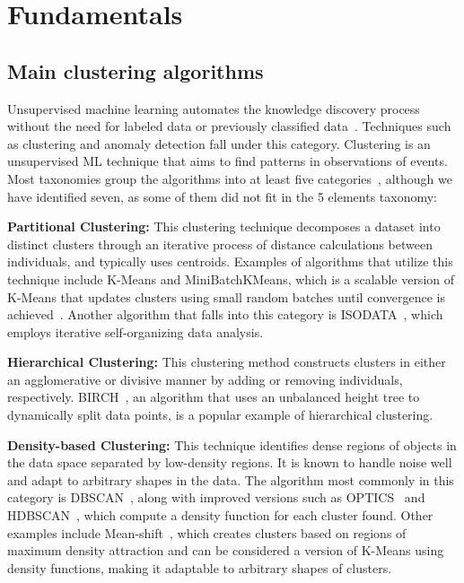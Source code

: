 \chapter{Fundamentals} \label{ch:fundamentals}

\section{Main clustering algorithms} \label{subsec:algorithms}

Unsupervised machine learning automates the knowledge discovery process without the need for labeled data or previously classified data~\cite{lau2019survey}. Techniques such as clustering and anomaly detection fall under this category. Clustering is an unsupervised ML technique that aims to find patterns in observations of events. Most taxonomies group the algorithms into at least five categories~\cite{halkidi2001clustering}, although we have identified seven, as some of them did not fit in the 5 elements taxonomy: 

\textbf{Partitional Clustering:} This clustering technique decomposes a dataset into distinct clusters through an iterative process of distance calculations between individuals, and typically uses centroids. Examples of algorithms that utilize this technique include K-Means and MiniBatchKMeans, which is a scalable version of K-Means that updates clusters using small random batches until convergence is achieved~\cite{bejar2013k}. Another algorithm that falls into this category is ISODATA~\cite{memarsadeghi2007fast}, which employs iterative self-organizing data analysis.

\textbf{Hierarchical Clustering:} This clustering method constructs clusters in either an agglomerative or divisive manner by adding or removing individuals, respectively. BIRCH~\cite{zhang1996birch}, an algorithm that uses an unbalanced height tree to dynamically split data points, is a popular example of hierarchical clustering.

\textbf{Density-based Clustering:} This technique identifies dense regions of objects in the data space separated by low-density regions. It is known to handle noise well and adapt to arbitrary shapes in the data. The algorithm most commonly in this category is DBSCAN~\cite{ester1996density}, along with improved versions such as OPTICS~\cite{ankerst1999optics} and HDBSCAN~\cite{mcinnes2017hdbscan}, which compute a density function for each cluster found. Other examples include Mean-shift~\cite{comaniciu2002mean}, which creates clusters based on regions of maximum density attraction and can be considered a version of K-Means using density functions, making it adaptable to arbitrary shapes of clusters.

